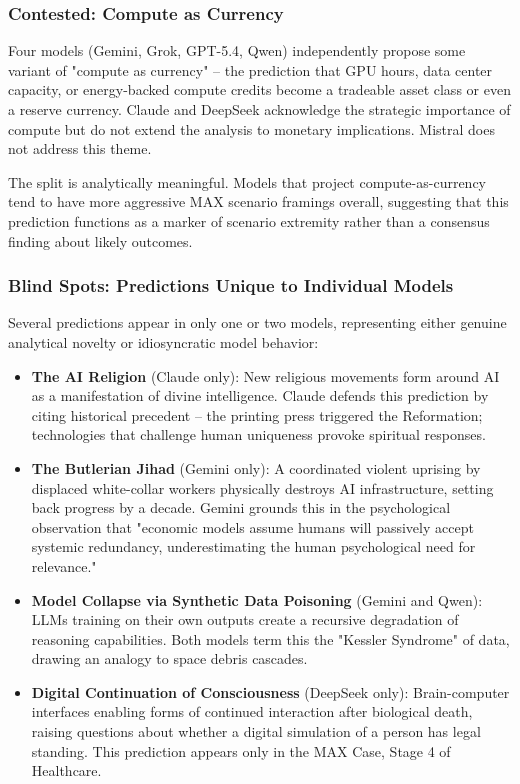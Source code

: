 \documentclass[preprint,review,12pt]{elsarticle}
\begin{document}
\subsubsection{Contested: Compute as Currency}
\label{sec:compute_currency}

Four models (Gemini, Grok, GPT-5.4, Qwen) independently propose some variant of "compute as currency" -- the prediction that GPU hours, data center capacity, or energy-backed compute credits become a tradeable asset class or even a reserve currency. Claude and DeepSeek acknowledge the strategic importance of compute but do not extend the analysis to monetary implications. Mistral does not address this theme.

The split is analytically meaningful. Models that project compute-as-currency tend to have more aggressive MAX scenario framings overall, suggesting that this prediction functions as a marker of scenario extremity rather than a consensus finding about likely outcomes.


\subsubsection{Blind Spots: Predictions Unique to Individual Models}
\label{sec:blind_spots}

Several predictions appear in only one or two models, representing either genuine analytical novelty or idiosyncratic model behavior:

\begin{itemize}
  \item \textbf{The AI Religion} (Claude only): New religious movements form around AI as a manifestation of divine intelligence. Claude defends this prediction by citing historical precedent -- the printing press triggered the Reformation; technologies that challenge human uniqueness provoke spiritual responses.
  \item \textbf{The Butlerian Jihad} (Gemini only): A coordinated violent uprising by displaced white-collar workers physically destroys AI infrastructure, setting back progress by a decade. Gemini grounds this in the psychological observation that "economic models assume humans will passively accept systemic redundancy, underestimating the human psychological need for relevance."
  \item \textbf{Model Collapse via Synthetic Data Poisoning} (Gemini and Qwen): LLMs training on their own outputs create a recursive degradation of reasoning capabilities. Both models term this the "Kessler Syndrome" of data, drawing an analogy to space debris cascades.
  \item \textbf{Digital Continuation of Consciousness} (DeepSeek only): Brain-computer interfaces enabling forms of continued interaction after biological death, raising questions about whether a digital simulation of a person has legal standing. This prediction appears only in the MAX Case, Stage 4 of Healthcare.

\end{itemize}
\end{document}
